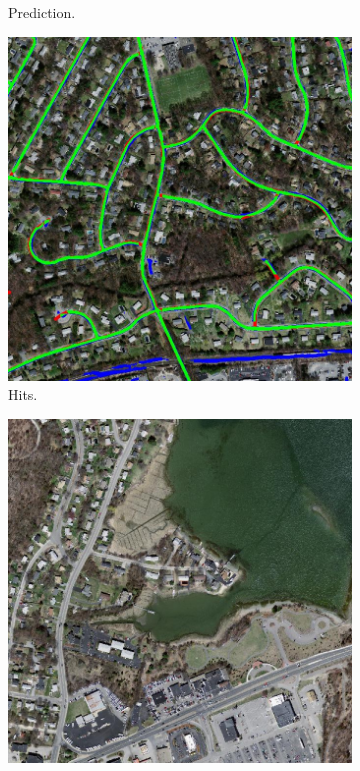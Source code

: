 \begin{figure}[H]
\begin{subfigure}{0.23\textwidth}
\caption{ Prediction. }
\vspace{0.2cm} %
\end{subfigure}
\hspace*{\fill} %
\begin{subfigure}{0.23\textwidth}
\includegraphics[width=\textwidth]{figs/appendix/hit20878930_15.jpg}
\caption{ Hits. }
\vspace{0.2cm} %
\end{subfigure}
\begin{subfigure}{0.23\textwidth}
\includegraphics[width=\textwidth]{figs/appendix/img24628885_15.jpg}

\end{subfigure}
\end{figure}
